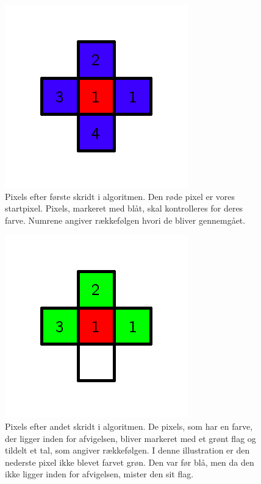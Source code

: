 {\begin{figure}[!h]
    \begin{center}
        \includegraphics[scale=0.42,angle=0]{afsnit/vores_implementation/billeder/flood_fill/floodfill2}
    \end{center}
    \caption[]{Pixels efter første skridt i algoritmen. Den røde pixel
    er vores startpixel. Pixels, markeret med blåt, skal kontrolleres for
    deres farve. Numrene angiver rækkefølgen hvori de bliver gennemgået.}
    \label{floodfill2}
\end{figure}

\begin{figure}[!h]
    \begin{center}
        \includegraphics[scale=0.42,angle=0]{afsnit/vores_implementation/billeder/flood_fill/floodfill3}
    \end{center}
    \caption[]{Pixels efter andet skridt i algoritmen. De pixels, som har
    en farve, der ligger inden for afvigelsen, bliver markeret med et grønt
    flag og tildelt et tal, som angiver rækkefølgen. I denne illustration
    er den nederste pixel ikke blevet farvet grøn. Den var før blå, men
    da den ikke ligger inden for afvigelsen, mister den sit flag.}
    \label{floodfill3}
\end{figure}

}
